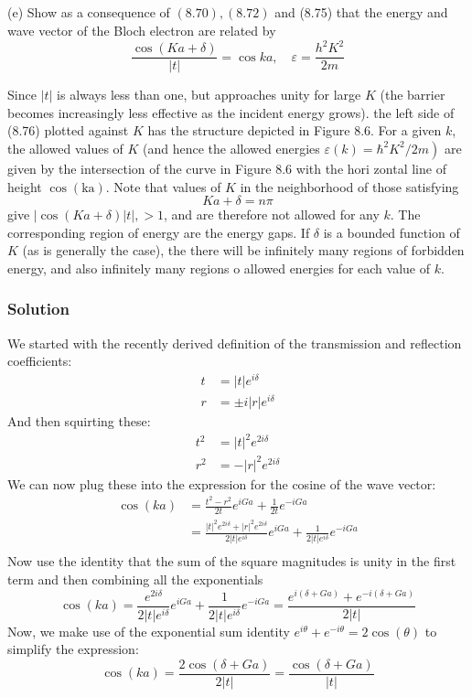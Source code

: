 \documentclass[12pt]{article}
\begin{document}
\subsection{}
(e) Show as a consequence of $(8.70),(8.72)$ and (8.75) that the energy and wave vector of the Bloch electron are related by
$$
\frac{\cos (K a+\delta)}{|t|}=\cos k a, \quad \varepsilon=\frac{h^2 K^2}{2 m}
$$

Since $|t|$ is always less than one, but approaches unity for large $K$ (the barrier becomes increasingly less effective as the incident energy grows). the left side of (8.76) plotted against $K$ has the structure depicted in Figure 8.6. For a given $k$, the allowed values of $K$ (and hence the allowed energies $\left.\varepsilon(k)=\hbar^2 K^2 / 2 m\right)$ are given by the intersection of the curve in Figure 8.6 with the hori zontal line of height $\cos (\mathrm{ka})$. Note that values of $K$ in the neighborhood of those satisfying
$$
K a+\delta=n \pi
$$
give $|\cos (K a+\delta)| t \mid,>1$, and are therefore not allowed for any $k$. The corresponding region of energy are the energy gaps. If $\delta$ is a bounded function of $K$ (as is generally the case), the there will be infinitely many regions of forbidden energy, and also infinitely many regions o allowed energies for each value of $k$.
\subsubsection{Solution}
We started with the recently derived definition of the transmission and reflection coefficients:
\begin{align}
    t &= |t|e^{i\delta} \\
    r &= \pm i|r|e^{i\delta}
\end{align}
And then squirting these:
\begin{align}
    t^2 &= |t|^2e^{2i\delta} \\
    r^2 &= -|r|^2e^{2i\delta}
\end{align}
We can now plug these into the expression for the cosine of the wave vector:
\begin{align}
    \cos(ka) &= \frac{t^2 - r^2}{2t}e^{iGa} + \frac{1}{2t}e^{-iGa} \\
    &= \frac{|t|^2e^{2i\delta} + |r|^2e^{2i\delta}}{2|t|e^{i\delta}}e^{iGa} + \frac{1}{2|t|e^{i\delta}}e^{-iGa} \\
\end{align}
Now use the identity that the sum of the square magnitudes is unity in the first term and then combining all the exponentials
\begin{equation}
    \cos(ka) = \frac{e^{2i\delta}}{2|t|e^{i\delta}}e^{iGa} + \frac{1}{2|t|e^{i\delta}}e^{-iGa} = \frac{e^{i\left(\delta + Ga\right)} + e^{-i\left(\delta + Ga\right)}}{2|t|}
\end{equation}
Now, we make use of the exponential sum identity $e^{i\theta} + e^{-i\theta} = 2\cos(\theta)$ to simplify the expression:
\begin{equation}
    \cos(ka) = \frac{2\cos(\delta + Ga)}{2|t|} = \frac{\cos(\delta + Ga)}{|t|}
\end{equation}
\end{document}
